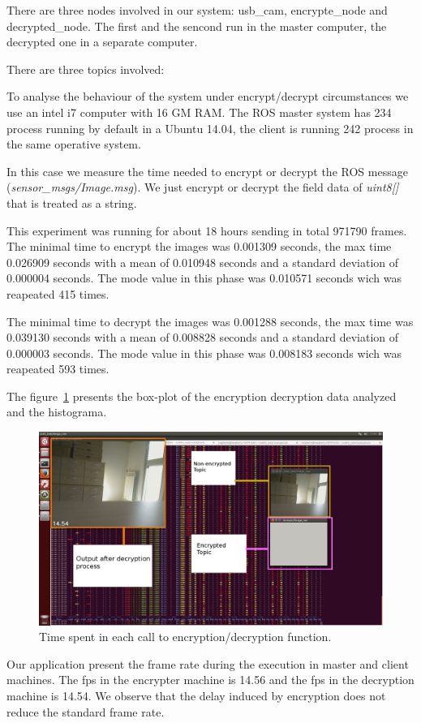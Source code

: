 \documentclass[journal,twoside]{JoPhA}
\begin{document}
There are three nodes involved in our system: usb\_cam, encrypte\_node and decrypted\_node. The first and the sencond run in the master computer, the decrypted one in a separate computer.

There are three topics involved: 

To analyse the behaviour of the system under encrypt/decrypt circumstances we use an intel i7 computer with 16 GM RAM. The ROS master system has 234 process running by default in a Ubuntu 14.04, the client is running 242 process in the same operative system.

In this case we measure the time needed to encrypt or decrypt the ROS message ({\em sensor\_msgs/Image.msg}). We just encrypt or decrypt the field data of {\em uint8[]} that is treated as a string.

This experiment was running for about 18 hours sending in total 971790 frames. The minimal time to encrypt the images was 0.001309 seconds, the max time  0.026909 seconds with a 
mean of  0.010948 seconds and a standard deviation of 0.000004 seconds. The mode value in this phase was 0.010571 seconds wich was reapeated 415 times. 

The minimal time to decrypt the images was 0.001288 seconds, the max time was 0.039130 seconds with a 
mean of  0.008828 seconds and a standard deviation of 0.000003 seconds. The mode value in this phase was 0.008183 seconds wich was reapeated 593 times. 


The figure~\ref{fig:graphicalRepresentation} presents the box-plot of the encryption decryption data analyzed and the histograma. 

\begin{figure}[ht]
    \centering
    \includegraphics[width=.5\textwidth]{Screenshot.png}
    \caption{Time spent in each call to encryption/decryption function.}
  \label{fig:graphicalRepresentation}
\end{figure}


Our application present the frame rate during the execution in master and client machines. The fps in the encrypter machine is 14.56 and the fps in the decryption machine is 14.54.
We observe that the delay induced by encryption does not reduce the standard frame rate. 
\end{document}
